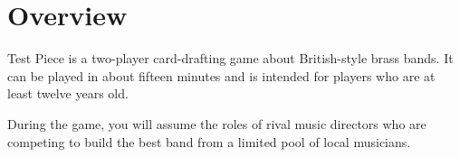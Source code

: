 \documentclass[a6paper, 12pt, parskip=half, DIV=14]{scrartcl}
\begin{document}
\begin{titlepage}

\enlargethispage{3.5\baselineskip}
\Large
\setmainfont[Scale=1.05]{Playball}
\phantom{test}
\vfill
\begin{center}
\end{center}
\end{titlepage}


\ClearShipoutPicture
\enlargethispage{1.75\baselineskip}
\section*{Overview}
Test Piece is a two-player card-drafting game about British-style brass bands. It can be played in about fifteen minutes and is intended for players who are at least twelve years old.

During the game, you will assume the roles of rival music directors who are competing to build the best band from a limited pool of local musicians.

\vspace{0.1cm}
\end{document}

